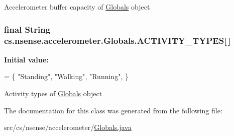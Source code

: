 Accelerometer buffer capacity of \hyperlink{classcs_1_1nsense_1_1accelerometer_1_1_globals}{Globals} object \hypertarget{classcs_1_1nsense_1_1accelerometer_1_1_globals_ac5af2c0258497b76a55fc1685c450362}{
\subsubsection[{A\-C\-T\-I\-V\-I\-T\-Y\-\_\-\-T\-Y\-P\-E\-S}]{\setlength{\rightskip}{0pt plus 5cm}final String cs.\-nsense.\-accelerometer.\-Globals.\-A\-C\-T\-I\-V\-I\-T\-Y\-\_\-\-T\-Y\-P\-E\-S\mbox{[}$\,$\mbox{]}\hspace{0.3cm}{\ttfamily [static]}}}\label{classcs_1_1nsense_1_1accelerometer_1_1_globals_ac5af2c0258497b76a55fc1685c450362}
{\bfseries Initial value\-:}
\begin{DoxyCode}
= \{
        \textcolor{stringliteral}{"Standing"}, \textcolor{stringliteral}{"Walking"}, \textcolor{stringliteral}{"Running"}, 
    \}
\end{DoxyCode}
Activity types of \hyperlink{classcs_1_1nsense_1_1accelerometer_1_1_globals}{Globals} object 

The documentation for this class was generated from the following file\-:\begin{DoxyCompactItemize}
\item 
src/cs/nsense/accelerometer/\hyperlink{_globals_8java}{Globals.\-java}\end{DoxyCompactItemize}
